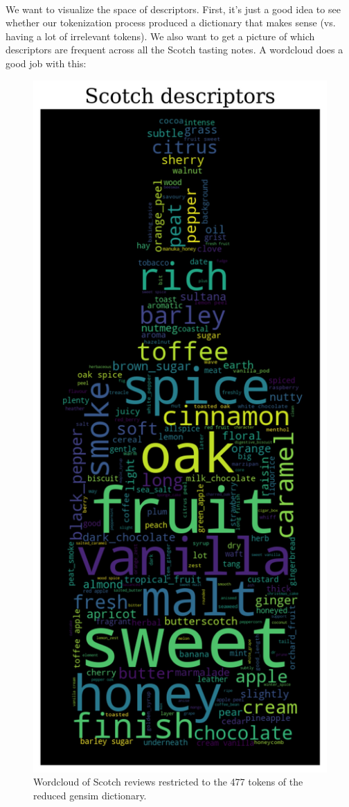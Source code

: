 \documentclass{article}
\begin{document}
 	\paragraph{} We want to visualize the space of descriptors. First, it's just a good idea to see whether our tokenization process produced a dictionary that makes sense (vs. having a lot of irrelevant tokens). We also want to get a picture of which descriptors are frequent across all the Scotch tasting notes. A wordcloud does a good job with this:
	 \begin{figure}[H]
	 	\begin{center}
	 		\includegraphics[totalheight=12cm]{../images/EDA/wc_token_unified.jpg}
	 	\end{center}
	 	\caption{Wordcloud of Scotch reviews restricted to the 477 tokens of the reduced gensim dictionary.}
	 \end{figure}
\end{document}
